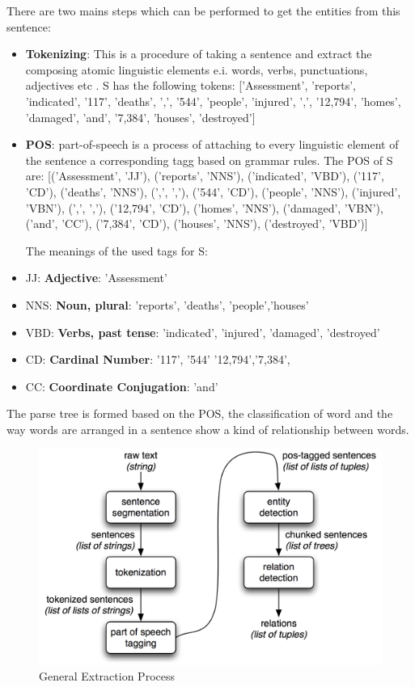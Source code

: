 There are two mains steps which can be performed to get the entities from  this sentence:
\begin{itemize}
\item \textbf{Tokenizing}: This is a procedure of taking a sentence and extract the composing atomic linguistic elements e.i. words, verbs, punctuations, adjectives etc .
S has the following tokens: ['Assessment', 'reports', 'indicated', '117', 'deaths', ',', '544', 'people', 'injured', ',', '12,794', 'homes', 'damaged', 'and', '7,384', 'houses', 'destroyed']
\item \textbf{POS}: part-of-speech is a process of attaching to every linguistic element of the sentence a corresponding tagg based on grammar rules.
The POS of S  are: 
[('Assessment', 'JJ'), ('reports', 'NNS'), ('indicated', 'VBD'), ('117', 'CD'), ('deaths', 'NNS'), (',', ','), ('544', 'CD'), ('people', 'NNS'), ('injured', 'VBN'), (',', ','), ('12,794', 'CD'), ('homes', 'NNS'), ('damaged', 'VBN'), ('and', 'CC'), ('7,384', 'CD'), ('houses', 'NNS'), ('destroyed', 'VBD')]

The meanings of the used tags for S:
\end{itemize}
\begin{itemize}
\item JJ: \textbf{Adjective}: 'Assessment'   
\item NNS: \textbf{Noun, plural}: 'reports', 'deaths', 'people','houses'
\item VBD: \textbf{Verbs, past tense}: 'indicated',             'injured', 'damaged', 'destroyed'
\item CD: \textbf{Cardinal Number}: '117', '544' '12,794','7,384',
\item CC: \textbf{Coordinate Conjugation}: 'and'
\end{itemize}
The parse tree is formed based on the POS, the classification of word and the way words are arranged in a sentence show a kind of relationship between words.
\begin{figure}[hbtp]
\caption{General Extraction Process }
\centering
\includegraphics[scale=0.7]{images/pos.png}
\end{figure}



